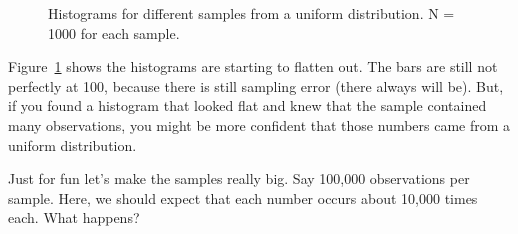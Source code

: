 \documentclass[
  letterpaper,
  DIV=11,
  numbers=noendperiod]{scrreprt}
\begin{document}
\begin{figure}


\caption{\label{fig-5unifsamp1000}Histograms for different samples from
a uniform distribution. N = 1000 for each sample.}

\end{figure}%

Figure~\ref{fig-5unifsamp1000} shows the histograms are starting to
flatten out. The bars are still not perfectly at 100, because there is
still sampling error (there always will be). But, if you found a
histogram that looked flat and knew that the sample contained many
observations, you might be more confident that those numbers came from a
uniform distribution.

Just for fun let's make the samples really big. Say 100,000 observations
per sample. Here, we should expect that each number occurs about 10,000
times each. What happens?
\end{document}
